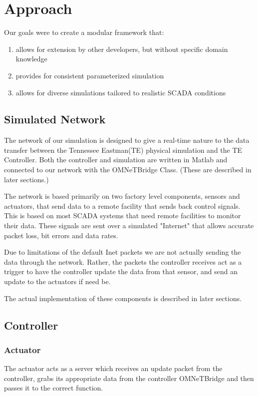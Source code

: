 \section{Approach}
Our goals were to create a modular framework that:
\begin{enumerate}
\item allows for extension by other developers, but without specific domain knowledge
\item provides for consistent parameterized simulation
\item allows for diverse simulations tailored to realistic SCADA conditions
\end{enumerate}
\subsection{Simulated Network}

The network of our simulation is designed to give a real-time nature to the data transfer between the Tennessee Eastman(TE) physical simulation and the TE Controller. Both the controller and simulation are written in Matlab and connected to our network with the OMNeTBridge Class. (These are described in later sections.)

The network is based primarily on two factory level components, sensors and actuators, that send data to a remote facility that sends back control signals. This is based on most SCADA systems that need remote facilities to monitor their data. These signals are sent over a simulated "Internet" that allows accurate packet loss, bit errors and data rates. 

Due to limitations of the default Inet packets we are not actually sending the data through the network. Rather, the packets the controller receives act as a trigger to have the controller update the data from that sensor, and send an update to the actuators if need be. 

The actual implementation of these components is described in later sections. 


\subsection{Controller}


\subsubsection{Actuator}

The actuator acts as a server which receives an update packet from the controller, grabs its appropriate data from the controller OMNeTBridge and then passes it to the correct function.

